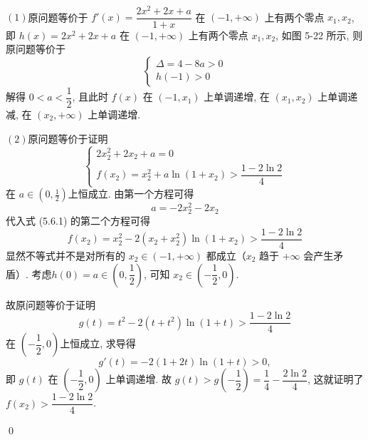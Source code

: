 \begin{jie}
    \                  

    \((1)\)原问题等价于 $f'(x) = \dfrac{2x^2 + 2x + a}{1 + x}$ 在 $(-1, +\infty)$ 上有两个零点 $x_1, x_2$, 即 $h(x) = 2x^2 + 2x + a$ 在 $(-1, +\infty)$ 上有两个零点 $x_1, x_2$, 如图 5-22 所示, 则原问题等价于
    \[
    \begin{cases}
        \Delta = 4 - 8a > 0 \\
        h(-1) > 0
    \end{cases}
    \]
    解得 $0 < a < \dfrac{1}{2}$, 且此时 $f(x)$ 在 $(-1, x_1)$ 上单调递增, 在 $(x_1, x_2)$ 上单调递减, 在 $(x_2, +\infty)$ 上单调递增. 

    \((2)\)原问题等价于证明
    \[
    \begin{cases}
        2x_2^2 + 2x_2 + a = 0 \\
        f(x_2) = x_2^2 + a \ln(1 + x_2) > \dfrac{1 - 2\ln 2}{4}
    \end{cases}
    \]
    在 $a \in \left(0, \frac{1}{2}\right)$上恒成立. 由第一个方程可得
    \[a = -2x_2^2 - 2x_2 \]
    代入式 (5.6.1) 的第二个方程可得
    \[f(x_2) = x_2^2 - 2(x_2 + x_2^2) \ln(1 + x_2) > \frac{1 - 2\ln 2}{4} \]
    显然不等式并不是对所有的 $x_2 \in (-1, +\infty)$ 都成立（$x_2$ 趋于 $+\infty$ 会产生矛盾）. 
    考虑\(h(0)=a\in(0,\dfrac{1}{2})\), 可知 $x_2 \in \left(-\dfrac{1}{2}, 0\right)$. 

    故原问题等价于证明 $$g(t) = t^2 - 2(t + t^2) \ln(1 + t) > \frac{1 - 2\ln 2}{4}$$
    在 $\left(-\dfrac{1}{2}, 0\right)$上恒成立, 求导得
    \[g'(t) = -2(1 + 2t) \ln(1 + t) > 0, \]
    即 $g(t)$ 在 $\left(-\dfrac{1}{2}, 0\right)$ 上单调递增. 
    故 $g(t) > g\left(-\dfrac{1}{2}\right) = \dfrac{1}{4} - \dfrac{2\ln 2}{4}$, 这就证明了 $f(x_2) > \dfrac{1 - 2\ln 2}{4}$. 

    \qed
\end{jie}


